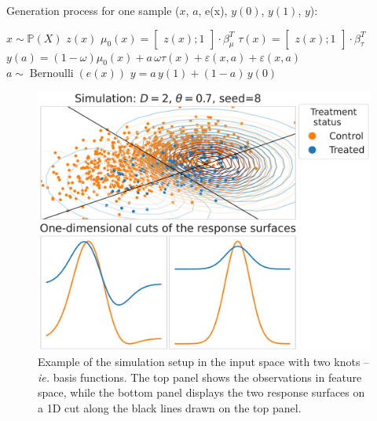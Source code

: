 \documentclass[a4paper,num-refs]{oup-contemporary}%
\begin{document}
\begin{algorithm}
    Generation process for one sample ($x$, $a$, e(x), $y(0)$, $y(1)$, $y$):
    \begin{algorithmic}[1]
        \State $x \sim \mathbb P(X)$ 
        \State  $z(x)$ 
        \State $\mu_0(x) = \begin{bmatrix} z(x); 1 \end{bmatrix} \cdot \beta_{\mu}^T$ 
        \State  $\tau(x) = \begin{bmatrix} z(x); 1 \end{bmatrix} \cdot \beta_{\tau}^T$ 
        \State $y(a) = (1-\omega) \mu_0(x) + a\,\omega\tau(x) + \varepsilon(x, a) + \varepsilon(x, a)$ 
        \State $a \sim \operatorname{Bernoulli}(e(x))$ 
        \State $y = a\,y(1) + (1-a)\,y(0)$ 
    \end{algorithmic}

\end{algorithm}

\begin{figure}[!t]
    \centering
    \includegraphics[width=0.8\linewidth]{caussim_example.pdf}

    \caption{Example of the simulation setup in the input space with two
        knots --\emph{ie.} basis functions. The top panel
        shows the observations in feature space, while the bottom panel displays the
        two response surfaces on a 1D cut along the black lines drawn on
        the top panel.}
    \label{fig:simulation_examples}
\end{figure}
\end{document}
